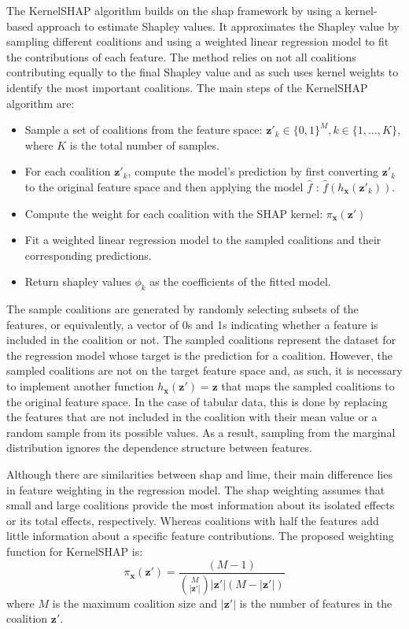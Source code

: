 The KernelSHAP algorithm builds on the \acrshort{shap} framework by using a kernel-based approach to estimate Shapley values. It approximates the Shapley value by sampling different coalitions and using a weighted linear regression model to fit the contributions of each feature. The method relies on not all coalitions contributing equally to the final Shapley value and as such uses kernel weights to identify the most important coalitions. The main steps of the KernelSHAP algorithm are:
\begin{itemize}
    \item Sample a set of coalitions from the feature space: $\mathbf{z}'_k \in \{0,1\}^M, k \in \{1, \ldots, K\}$, where $K$ is the total number of samples.
    \item For each coalition $\mathbf{z}'_k$, compute the model's prediction by first converting $\mathbf{z}'_k$ to the original feature space and then applying the model $\hat{f}$ : $\hat{f}\left(h_\mathbf{x}\left(\mathbf{z}'_k\right)\right)$.
    \item Compute the weight for each coalition with the SHAP kernel: $\pi_\mathbf{x} (\mathbf{z}')$ 
    \item Fit a weighted linear regression model to the sampled coalitions and their corresponding predictions.
    \item Return shapley values $\phi_k$ as the coefficients of the fitted model.
\end{itemize}

The sample coalitions are generated by randomly selecting subsets of the features, or equivalently, a vector of 0s and 1s indicating whether a feature is included in the coalition or not. The sampled coalitions represent the dataset for the regression model whose target is the prediction for a coalition. However, the sampled coalitions are not on the target feature space and, as such, it is necessary to implement another function $h_{\mathbf{x}}\left(\mathbf{z}'\right) = \mathbf{z}$ that maps the sampled coalitions to the original feature space. In the case of tabular data, this is done by replacing the features that are not included in the coalition with their mean value or a random sample from its possible values. As a result, sampling from the marginal distribution ignores the dependence structure between features.

Although there are similarities between \acrshort{shap} and \acrshort{lime}, their main difference lies in feature weighting in the regression model. The \acrshort{shap} weighting assumes that small and large coalitions provide the most information about its isolated effects or its total effects, respectively. Whereas coalitions with half the features add little information about a specific feature contributions. The proposed weighting function for KernelSHAP is:
\begin{equation}
    \pi_\mathbf{x} (\mathbf{z}') = \frac{(M - 1)}{\binom{M}{|\mathbf{z}'|} |\mathbf{z}'| \left(M - |\mathbf{z}'|\right)}
\end{equation}
where $M$ is the maximum coalition size and $|\mathbf{z}'|$ is the number of features in the coalition $\mathbf{z}'$.

